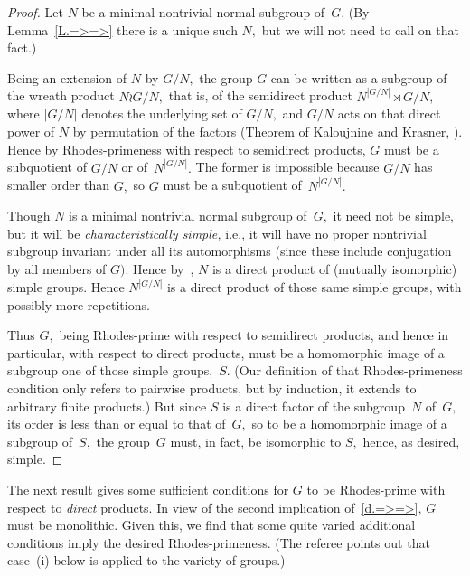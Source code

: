 \documentclass{amsart}
\numberwithin{equation}{section}
\numberwithin{theorem}{section}
\begin{document}
\begin{proof}
Let $N$ be a minimal nontrivial normal subgroup of~$G.$
(By Lemma~\ref{L.=>=>} there is a
unique such $N,$ but we will not need to call on that fact.)

Being an extension of $N$ by $G/N,$
the group $G$ can be written as a subgroup of the wreath
product $N\wr G/N,$ that is, of the semidirect product
$N^{|G/N|}\rtimes G/N,$ where $|G/N|$ denotes the
underlying set of $G/N,$ and $G/N$ acts on that direct power
of $N$ by permutation of the factors
(Theorem of Kaloujnine and Krasner, \cite[Theorem~22.21, p.\,46]{HN}).
Hence by Rhodes-primeness with respect to semidirect products,
$G$ must be a subquotient of $G/N$ or of~$N^{|G/N|}.$
The former is impossible because $G/N$ has smaller
order than $G,$ so $G$ must be a subquotient of~$N^{|G/N|}.$

Though $N$ is a minimal nontrivial normal subgroup of~$G,$
it need not be simple, but
it will be {\em characteristically simple,} i.e.,
it will have no proper nontrivial subgroup invariant
under all its automorphisms (since these include conjugation
by all members of $G).$
Hence by~\cite[3.3.15,~p.\,87, and sentence at end of
proof,~p.\,88]{DJRS},
$N$ is a direct product of (mutually isomorphic) simple groups.
Hence $N^{|G/N|}$ is a direct product of those same simple groups,
with possibly more repetitions.

Thus $G,$ being Rhodes-prime with respect to semidirect products,
and hence in particular, with respect to direct products, must be
a homomorphic image of a subgroup one of those simple groups,~$S.$
(Our definition of that Rhodes-primeness condition only
refers to pairwise products, but by induction, it
extends to arbitrary finite products.)
But since $S$ is a direct factor of the subgroup~$N$
of~$G,$ its order is less than or equal to that of~$G,$
so to be a homomorphic image of a subgroup of~$S,$ the group~$G$
must, in fact, be isomorphic to $S,$ hence, as desired, simple.
\end{proof}

The next result gives some sufficient conditions for $G$ to be
Rhodes-prime with respect to {\em direct} products.
In view of the second implication of~\eqref{d.=>=>}, $G$
must be monolithic.
Given this, we find that some quite varied additional
conditions imply the desired Rhodes-primeness.
(The referee points out that case~(i) below is
\mbox{\cite[Theorem~10.1]{RF+RMcK}} applied to the variety of groups.)
\end{document}
